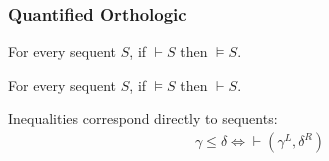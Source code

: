 \documentclass[
    aspectratio=169,
    xcolor={dvipsnames},
]{beamer}
\begin{document}
\begin{frame}
    \frametitle{Quantified Orthologic}


    \begin{theorem}[Soundness]
        For every sequent \(S\), if \(\vdash S\) then \(\models S\).
    \end{theorem}

    \begin{theorem}[Completeness]
        For every sequent \(S\), if \(\models S\) then \(\vdash S\).
    \end{theorem}


    \pause

    Inequalities correspond directly to sequents:
    \begin{gather*}
        \gamma \leq \delta \iff \vdash (\gamma^L, \delta^R)
    \end{gather*}

\end{frame}

\end{document}
